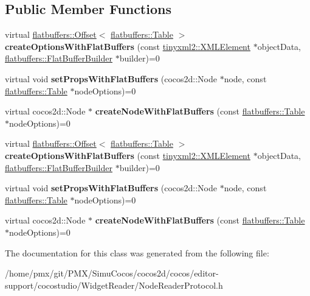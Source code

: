 \subsection*{Public Member Functions}
\begin{DoxyCompactItemize}
\item 
\mbox{\label{classcocostudio_1_1NodeReaderProtocol_aa6c9977bf44d55321088026167ed01a5}} 
virtual \hyperlink{structflatbuffers_1_1Offset}{flatbuffers\+::\+Offset}$<$ \hyperlink{classflatbuffers_1_1Table}{flatbuffers\+::\+Table} $>$ {\bfseries create\+Options\+With\+Flat\+Buffers} (const \hyperlink{classtinyxml2_1_1XMLElement}{tinyxml2\+::\+X\+M\+L\+Element} $\ast$object\+Data, \hyperlink{classflatbuffers_1_1FlatBufferBuilder}{flatbuffers\+::\+Flat\+Buffer\+Builder} $\ast$builder)=0
\item 
\mbox{\label{classcocostudio_1_1NodeReaderProtocol_a6d4d66ca73fd8f5fffb4bf5baf5a9481}} 
virtual void {\bfseries set\+Props\+With\+Flat\+Buffers} (cocos2d\+::\+Node $\ast$node, const \hyperlink{classflatbuffers_1_1Table}{flatbuffers\+::\+Table} $\ast$node\+Options)=0
\item 
\mbox{\label{classcocostudio_1_1NodeReaderProtocol_a3841cbd2120465f71f5babee926a9b94}} 
virtual cocos2d\+::\+Node $\ast$ {\bfseries create\+Node\+With\+Flat\+Buffers} (const \hyperlink{classflatbuffers_1_1Table}{flatbuffers\+::\+Table} $\ast$node\+Options)=0
\item 
\mbox{\label{classcocostudio_1_1NodeReaderProtocol_aa6c9977bf44d55321088026167ed01a5}} 
virtual \hyperlink{structflatbuffers_1_1Offset}{flatbuffers\+::\+Offset}$<$ \hyperlink{classflatbuffers_1_1Table}{flatbuffers\+::\+Table} $>$ {\bfseries create\+Options\+With\+Flat\+Buffers} (const \hyperlink{classtinyxml2_1_1XMLElement}{tinyxml2\+::\+X\+M\+L\+Element} $\ast$object\+Data, \hyperlink{classflatbuffers_1_1FlatBufferBuilder}{flatbuffers\+::\+Flat\+Buffer\+Builder} $\ast$builder)=0
\item 
\mbox{\label{classcocostudio_1_1NodeReaderProtocol_a6d4d66ca73fd8f5fffb4bf5baf5a9481}} 
virtual void {\bfseries set\+Props\+With\+Flat\+Buffers} (cocos2d\+::\+Node $\ast$node, const \hyperlink{classflatbuffers_1_1Table}{flatbuffers\+::\+Table} $\ast$node\+Options)=0
\item 
\mbox{\label{classcocostudio_1_1NodeReaderProtocol_a3841cbd2120465f71f5babee926a9b94}} 
virtual cocos2d\+::\+Node $\ast$ {\bfseries create\+Node\+With\+Flat\+Buffers} (const \hyperlink{classflatbuffers_1_1Table}{flatbuffers\+::\+Table} $\ast$node\+Options)=0
\end{DoxyCompactItemize}


The documentation for this class was generated from the following file\+:\begin{DoxyCompactItemize}
\item 
/home/pmx/git/\+P\+M\+X/\+Simu\+Cocos/cocos2d/cocos/editor-\/support/cocostudio/\+Widget\+Reader/Node\+Reader\+Protocol.\+h\end{DoxyCompactItemize}
